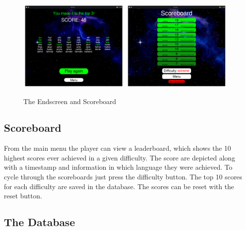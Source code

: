 \documentclass{article}[12pt]
\begin{document}
    \begin{figure}[h!]
        \includegraphics[width=0.49\textwidth]{pictures/endcard.png}
        \includegraphics[width=0.49\textwidth]{pictures/scoreboard.png}
        \caption{The Endscreen and Scoreboard}
    \end{figure}

    \subsection*{Scoreboard}
    From the main menu the player can view a leaderboard, which
    shows the 10 highest scores ever achieved in a given difficulty.
    The score are depicted along with a timestamp and information in which language they were achieved. To cycle through the scoreboards just press the difficulty button. The top 10 scores for each difficulty are saved in the database. The scores can be reset with the reset button.

    \subsection*{The Database}
\end{document}
